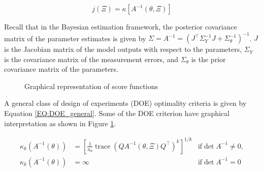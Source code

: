 \documentclass[../Article_Design_of_Experiment.tex]{subfiles}
\begin{document}
	{\footnotesize \begin{equation} j(\Xi) = \kappa\left[ A^{-1}(\theta, \Xi) \right] \end{equation} }
	
	Recall that in the Bayesian estimation framework, the posterior covariance matrix of the parameter estimates is given by $\Sigma = A^{-1} = \left(J^\top \Sigma_Y^{-1} J + \Sigma_\theta^{-1}\right)^{-1} $. $J$ is the Jacobian matrix of the model outputs with respect to the parameters, $\Sigma_Y$ is the covariance matrix of the measurement errors, and $\Sigma_\theta$ is the prior covariance matrix of the parameters.
	
	\begin{figure}[!h]
		\centering
		\caption{Graphical representation of score functions}
		\label{fig:score_fun}
	\end{figure}
	
	A general class of design of experiments (DOE) optimality criteria is given by Equation \ref{EQ:DOE_general}. Some of the DOE criterion have graphical interpretation as shown in Figure \ref{fig:score_fun}.
	
	{\footnotesize 
		\begin{align} \label{EQ:DOE_general}
			\kappa_k\left( A^{-1}(\theta) \right) &= \left[ \frac{1}{n_\theta} \operatorname{trace}\left( Q A^{-1}(\theta, \Xi) Q^\top \right)^k \right]^{1/k} & \text{if} \det A^{-1} \neq 0, \nonumber \\ 
			\kappa_k\left( A^{-1}(\theta) \right) &= \infty & \text{if} \det A^{-1} = 0
		\end{align} }
	
\end{document}
